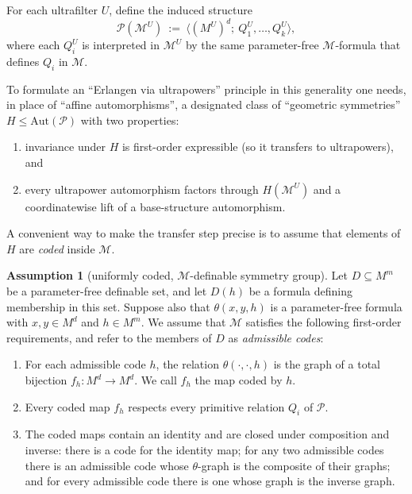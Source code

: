 \documentclass[11pt,a4paper]{article}
\renewcommand{\P}{\mathcal{P}}
\newcommand{\M}{\mathcal{M}}
\theoremstyle{definition}
\newtheorem{assumption}[theorem]{Assumption}
\begin{document}
For each ultrafilter $U$, define the induced structure \[
\P(\M^U)\ :=\ \langle (M^U)^d;\ Q_1^U,\dots,Q_k^U\rangle,
\] where each $Q_i^U$ is interpreted in $\M^U$ by the same
parameter-free $\M$-formula that defines $Q_i$ in
$\M$. %

To formulate an ``Erlangen via ultrapowers'' principle in this
generality one needs, in place of ``affine automorphisms'', a designated
class of ``geometric symmetries'' $H\le \mathrm{Aut}(\P)$ with two
properties:

\begin{enumerate}
\item
  invariance under $H$ is first-order expressible (so it transfers to
  ultrapowers), and
\item
  every ultrapower automorphism factors through $H(\M^U)$ and a
  coordinatewise lift of a base-structure automorphism.
\end{enumerate}

A convenient way to make the transfer step precise is to assume that
elements of $H$ are \emph{coded} inside $\M$.

\begin{assumption}[uniformly coded, $\M$-definable symmetry group]
	\label{ass:9.1}
Let $D \subseteq M^m$ be a parameter-free definable set, and let $D(h)$ be a formula defining
membership in this set. Suppose also that 
$\theta(x,y,h)$ is a parameter-free formula with $x,y\in M^d$ and $h\in M^m$. 
We assume that $\M$ satisfies the following first-order
requirements, and refer to the members of $D$ as \emph{admissible codes}:

\begin{enumerate}
\item
  For each admissible code $h$, the relation
  $\theta(\cdot,\cdot,h)$ is the graph of a total bijection
  $f_h:M^d\to M^d$. We call $f_h$ the map coded by $h$.
\item
  Every coded map $f_h$ respects every primitive relation $Q_i$ of $\P$.
\item
  The coded maps contain an identity and are closed under composition
  and inverse: there is a code for the identity map; for any two
  admissible codes there is an admissible code whose $\theta$-graph is
  the composite of their graphs; and for every admissible code there is
  one whose graph is the inverse graph.
\end{enumerate}
\end{assumption}
\end{document}
